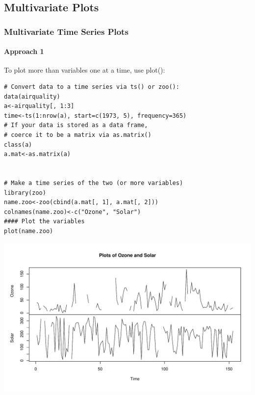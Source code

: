 



\subsection{Multivariate Plots}


\begin{frame}
 \frametitle{Multivariate Time Series Plots}
 \framesubtitle{Approach 1}

To plot more than variables one at a time, use \ttfamily plot(): \normalfont 
	\begin{lstlisting}
# Convert data to a time series via ts() or zoo():
data(airquality)
a<-airquality[, 1:3]
time<-ts(1:nrow(a), start=c(1973, 5), frequency=365)
# If your data is stored as a data frame,
# coerce it to be a matrix via as.matrix()
class(a)
a.mat<-as.matrix(a)


# Make a time series of the two (or more variables)
library(zoo)
name.zoo<-zoo(cbind(a.mat[, 1], a.mat[, 2]))
colnames(name.zoo)<-c("Ozone", "Solar")
#### Plot the variables
plot(name.zoo)
	\end{lstlisting}

       \begin{center}
         \includegraphics[width=1\textwidth]{images/Mtvsplot1.pdf}
        \end{center}
\end{frame}

